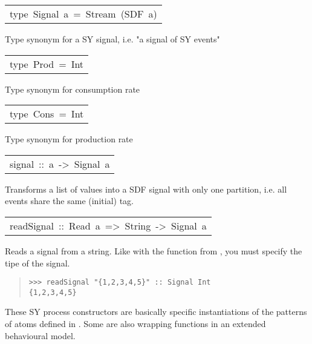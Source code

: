 \begin{haddockdesc}
\item[\begin{tabular}{@{}l}
type\ Signal\ a\ =\ Stream\ (SDF\ a)
\end{tabular}]\haddockbegindoc
Type synonym for a SY signal, i.e. "a signal of SY events"\par

\end{haddockdesc}
\begin{haddockdesc}
\item[\begin{tabular}{@{}l}
type\ Prod\ =\ Int
\end{tabular}]\haddockbegindoc
Type synonym for consumption rate\par

\end{haddockdesc}
\begin{haddockdesc}
\item[\begin{tabular}{@{}l}
type\ Cons\ =\ Int
\end{tabular}]\haddockbegindoc
Type synonym for production rate\par

\end{haddockdesc}
\begin{haddockdesc}
\item[\begin{tabular}{@{}l}
signal\ ::\ {\char 91}a{\char 93}\ ->\ Signal\ a
\end{tabular}]\haddockbegindoc
Transforms a list of values into a SDF signal with only one
 partition, i.e. all events share the same (initial) tag.\par

\end{haddockdesc}
\begin{haddockdesc}
\item[\begin{tabular}{@{}l}
readSignal\ ::\ Read\ a\ =>\ String\ ->\ Signal\ a
\end{tabular}]\haddockbegindoc
Reads a signal from a string. Like with the  function from
 , you must specify the tipe of the signal.\par
\begin{quote}
{\haddockverb\begin{verbatim}
>>> readSignal "{1,2,3,4,5}" :: Signal Int
{1,2,3,4,5}

\end{verbatim}}
\end{quote}
\end{haddockdesc}
These SY process constructors are basically specific
 instantiations of the patterns of atoms defined in
 . Some are also wrapping functions in an
 extended behavioural model.\par

